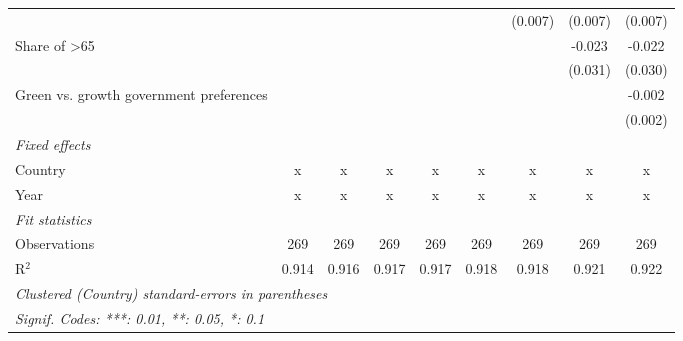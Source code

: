 \begin{table}[htbp]
\begin{tabular}{lcccccccc}
                                              &              &              &         &         &         & (0.007) & (0.007)     & (0.007)\\   
      Share of >65                            &              &              &         &         &         &         & -0.023      & -0.022\\   
                                              &              &              &         &         &         &         & (0.031)     & (0.030)\\   
      Green vs. growth government preferences &              &              &         &         &         &         &             & -0.002\\   
                                              &              &              &         &         &         &         &             & (0.002)\\   
      \emph{Fixed effects}\\
      Country                                 & x            & x            & x       & x       & x       & x       & x           & x\\  
      Year                                    & x            & x            & x       & x       & x       & x       & x           & x\\  
      \midrule \emph{Fit statistics}\\
      Observations                            & 269          & 269          & 269     & 269     & 269     & 269     & 269         & 269\\  
      R$^2$                                   & 0.914        & 0.916        & 0.917   & 0.917   & 0.918   & 0.918   & 0.921       & 0.922\\  
      \midrule
      \multicolumn{9}{l}{\emph{Clustered (Country) standard-errors in parentheses}}\\
      \multicolumn{9}{l}{\emph{Signif. Codes: ***: 0.01, **: 0.05, *: 0.1}}\\
   \end{tabular}
\end{table}


